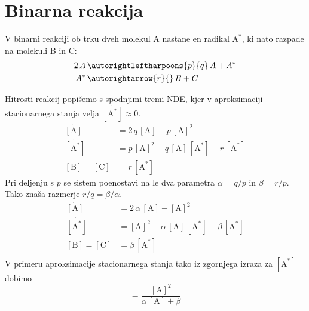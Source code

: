 \section{Binarna reakcija}

V binarni reakciji ob trku dveh molekul A nastane en radikal $\text{A}^*$, ki nato razpade na molekuli B in C:
\begin{align}
    2\, A \, &\autorightleftharpoons{p}{q} \, A + A^* \\ \nonumber
    A^* \, &\autorightarrow{r}{} \, B+C
\end{align}

Hitrosti reakcij popišemo s spodnjimi tremi NDE, kjer v aproksimaciji stacionarnega stanja velja $\dot{[\text{A}^*]} \approx 0$.
\begin{align}
    \dot{[\text{A}]} &= 2\,q\,[\text{A}] - p\,[\text{A}]^2 \\ \nonumber
    \dot{[\text{A}^*]} &= p\,[\text{A}]^2 - q\,[\text{A}]\,[\text{A}^*] - r\,[\text{A}^*] \\ \nonumber
    \dot{[\text{B}]} = \dot{[\text{C}]} &= r\,[\text{A}^*]
\end{align}
Pri deljenju s $p$ se sistem poenostavi na le dva parametra $\alpha = q/p$ in $\beta = r/p$. Tako znaša razmerje $r/q = \beta / \alpha$.
\begin{align}
    \dot{[\text{A}]} &= 2\, \alpha \,[\text{A}] - [\text{A}]^2 \\ \nonumber
    \dot{[\text{A}^*]} &= [\text{A}]^2 - \alpha \,[\text{A}]\,[\text{A}^*] - \beta \,[\text{A}^*] \\ \nonumber
    \dot{[\text{B}]} = \dot{[\text{C}]} &= \beta \,[\text{A}^*]
\end{align}
V primeru aproksimacije stacionarnega stanja tako iz zgornjega izraza za $\dot{[\text{A}^*]}$ dobimo
\begin{equation}
    [\text{A}^*] = \frac{[\text{A}]^2}{\alpha \, [\text{A}] + \beta}
\end{equation}

